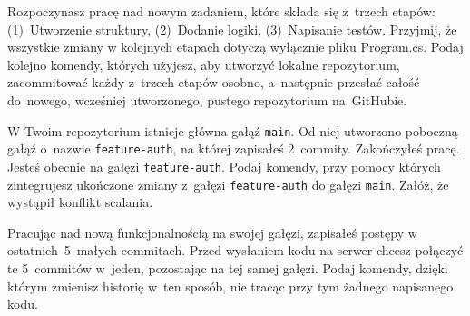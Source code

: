\documentclass[11pt,a4paper,addpoints]{exam}
\begin{document}
\cellwidth{2.75cm}
\noindent \gradetable[h]

\vspace{0.8cm}

\begin{questions}

\question[2] 
Rozpoczynasz pracę nad nowym zadaniem, które składa się z~trzech etapów: (1)~Utworzenie struktury, (2)~Dodanie logiki, (3)~Napisanie testów. Przyjmij, że wszystkie zmiany w kolejnych etapach dotyczą wyłącznie pliku Program.cs. Podaj kolejno komendy, których użyjesz, aby utworzyć lokalne repozytorium, zacommitować każdy z~trzech etapów osobno, a~następnie przesłać całość do~nowego, wcześniej utworzonego, pustego repozytorium na~GitHubie.
\fillwithdottedlines{6cm}

\question[2] 
W Twoim repozytorium istnieje główna gałąź \texttt{main}. Od niej utworzono poboczną gałąź o~nazwie \texttt{feature-auth}, na której zapisałeś 2~commity. Zakończyłeś pracę. Jesteś obecnie na gałęzi \texttt{feature-auth}. Podaj komendy, przy pomocy których zintegrujesz ukończone zmiany z~gałęzi \texttt{feature-auth} do gałęzi \texttt{main}. Załóż, że wystąpił konflikt scalania.
\fillwithdottedlines{6cm}

\newpage

\question[1] 
Pracując nad nową funkcjonalnością na swojej gałęzi, zapisałeś postępy w ostatnich~5~małych commitach. Przed wysłaniem kodu na serwer chcesz połączyć te 5~commitów w~jeden, pozostając na tej samej gałęzi. Podaj komendy, dzięki którym zmienisz historię w~ten sposób, nie tracąc przy tym żadnego napisanego kodu.
\fillwithdottedlines{6cm}

\end{questions}
\end{document}
